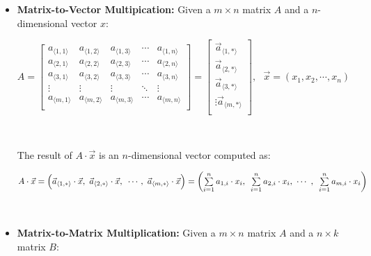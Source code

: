 \begin{tcolorbox}[title={\textbf{\tboxdef{\ref*{subsec:matrix-arithmetic}} Matrix Arithmetic}}]

\begin{itemize}
\item \textbf{Matrix-to-Vector Multipication:} Given a $m \times n$ matrix $A$ and a $n$-dimensional vector $x$: 


$A = \begin{bmatrix}
 a_{\langle 1, 1\rangle} & a_{\langle 1, 2\rangle} & a_{\langle 1, 3\rangle} & \cdots & a_{\langle 1, n\rangle}\\
 a_{\langle 2, 1\rangle} & a_{\langle 2, 2\rangle} & a_{\langle 2, 3\rangle} & \cdots & a_{\langle 2, n\rangle} \\
 a_{\langle 3, 1\rangle} & a_{\langle 3, 2\rangle} & a_{\langle 3, 3\rangle} & \cdots & a_{\langle 3, n\rangle} \\
\vdots & \vdots & \vdots & \ddots & \vdots \\
 a_{\langle m, 1\rangle} & a_{\langle m, 2\rangle} & a_{\langle m, 3\rangle} & \cdots & a_{\langle m, n\rangle} \\
\end{bmatrix} = \begin{bmatrix} 
\vec{a}_{\langle 1, * \rangle} \\ 
\vec{a}_{\langle 2, * \rangle} \\ 
\vec{a}_{\langle 3, * \rangle} \\ 
\vdots
\vec{a}_{\langle m, * \rangle} \\ 
\end{bmatrix}, \text{ } \vec{x} = (x_1, x_2, \cdots, x_{n})$


$ $

The result of $A \cdot \vec{x}$ is an $n$-dimensional vector computed as:

$A \cdot \vec{x} = \Big(\vec{a}_{\langle 1, * \rangle} \cdot \vec{x}, \text{ } \vec{a}_{\langle 2, * \rangle} \cdot \vec{x}, \text{ }\cdots,\text{ } \vec{a}_{\langle m, * \rangle} \cdot \vec{x} \Big) = \left(\sum\limits_{i=1}^{n} a_{1, i} \cdot  x_i, \text{ } \sum\limits_{i=1}^{n}  a_{2, i} \cdot x_i, \text{ } \text{$\cdots$} \text{ }, \text{ } \sum\limits_{i=1}^{n} a_{m, i} \cdot x_i \right)$


$ $


\item \textbf{Matrix-to-Matrix Multiplication:} Given a $m \times n$ matrix $A$ and a $n \times k$ matrix $B$: 




\end{itemize}
\end{tcolorbox}
